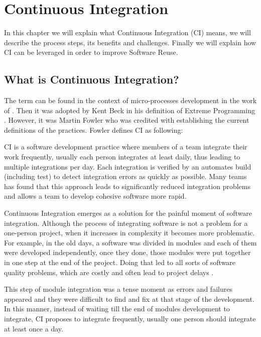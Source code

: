 \section{Continuous Integration}
\label{chap:ci}

In this chapter we will explain what Continuous Integration (CI) means, we will describe the process steps, its benefits and challenges. Finally we will explain how CI can be leveraged in order to improve Software Reuse.

\subsection{What is Continuous Integration?}
\label{sec:ci-def}

The term can be found in the context of micro-processes development in the work of \cite{Booch2007}. Then it was adopted by Kent Beck in his definition of Extreme Programming \citep{Beck1999}. However, it was Martin Fowler who was credited with establishing the current definitions of the practices. Fowler defines CI as following:

CI is a software development practice where members of a team integrate their work frequently, usually each person integrates at least daily, thus leading to multiple integrations per day. Each integration is verified by an automates build (including test) to detect integration errors as quickly as possible. Many teams has found that this approach leads to significantly reduced integration problems and allows a team to develop cohesive software more rapid\citep{Fowler2006}.

Continuous Integration emerges as a solution for the painful moment of software integration. Although the process of integrating software is not a problem for a one-person project, when it increases in complexity it becomes more problematic. For example, in the old days, a software was divided in modules and each of them were developed independently, once they done, those modules were put together in one step at the end of the project. Doing that led to all sorts of software quality problems, which are costly and often lead to project delays \citep{Duvall2007}.

This step of module integration was a tense moment as errors and failures appeared and they were difficult to find and fix at that stage of the development. In this manner, instead of waiting till the end of modules development to integrate, CI proposes to integrate frequently, usually one person should integrate at least once a day.

